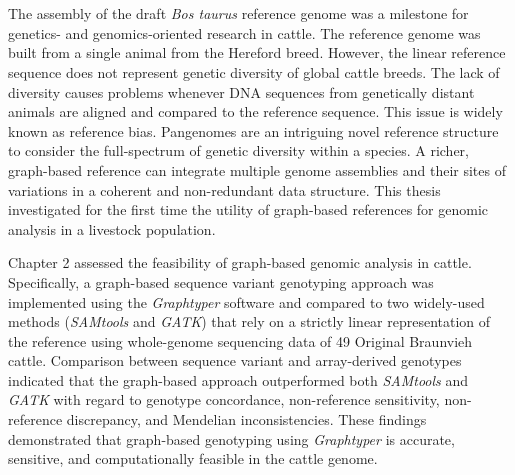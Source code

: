 \documentclass[11 pt, a4paper, notitlepage]{report}
\newif\iftwoside
\begin{document}
\newcommand*{\BuildingFromMainFile}{}



\iftwoside
\newpage
\thispagestyle{empty}
\ 
\newpage
\fi




\setcounter{tocdepth}{1}
\hypersetup{linkcolor=black}
\tableofcontents
{}
\newpage

\listoffigures 
{}
\newpage

\listoftables 
{}
\newpage

\section*{}
\thispagestyle{plain}

\setlength{\parskip}{\baselineskip}
\doublespacing
The assembly of the draft \emph{Bos taurus }reference genome was a milestone for genetics- and genomics-oriented research in cattle. The reference genome was built from a single animal from the Hereford breed. However, the linear reference sequence does not represent genetic diversity of global cattle breeds. The lack of diversity  causes problems whenever DNA sequences from genetically distant animals are aligned and compared to the reference sequence. This issue is widely known as reference bias. Pangenomes are an intriguing novel reference structure to consider the full-spectrum of genetic diversity within a species. A richer, graph-based reference can integrate multiple  genome assemblies and their sites of variations in a coherent and non-redundant data structure. This thesis investigated for the first time the utility of graph-based references for genomic analysis in a livestock population.

Chapter 2 assessed the feasibility of graph-based genomic analysis in cattle. Specifically, a graph-based sequence variant genotyping approach was implemented using the\emph{ Graphtyper} software and compared to two widely-used methods (\emph{SAMtools } and \emph{GATK}) that rely on a strictly linear representation of the reference using whole-genome sequencing data of 49 Original Braunvieh cattle. Comparison between sequence variant and array-derived genotypes indicated that the graph-based approach outperformed both \emph{SAMtools} and \emph{GATK} with regard to genotype concordance, non-reference sensitivity, non-reference discrepancy, and Mendelian inconsistencies. These findings demonstrated that graph-based genotyping using \emph{Graphtyper} is accurate, sensitive, and computationally feasible in the cattle genome. 
\end{document}
